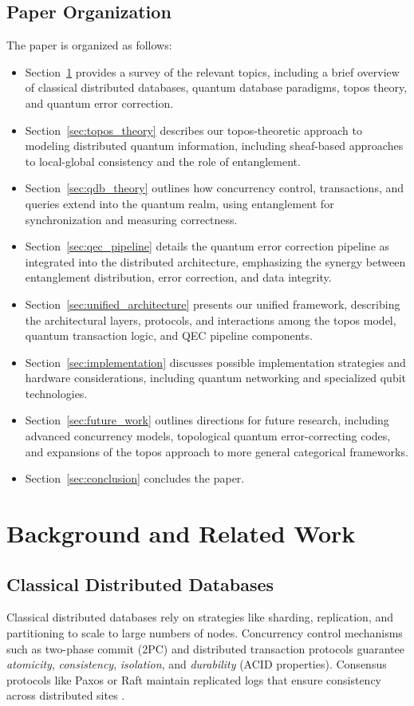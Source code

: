 \documentclass[11pt]{article}
\begin{document}
\subsection{Paper Organization}
The paper is organized as follows:
\begin{itemize}
    \item Section~\ref{sec:background} provides a survey of the relevant topics, including a brief overview of classical distributed databases, quantum database paradigms, topos theory, and quantum error correction.
    \item Section~\ref{sec:topos_theory} describes our topos-theoretic approach to modeling distributed quantum information, including sheaf-based approaches to local-global consistency and the role of entanglement.
    \item Section~\ref{sec:qdb_theory} outlines how concurrency control, transactions, and queries extend into the quantum realm, using entanglement for synchronization and measuring correctness.
    \item Section~\ref{sec:qec_pipeline} details the quantum error correction pipeline as integrated into the distributed architecture, emphasizing the synergy between entanglement distribution, error correction, and data integrity.
    \item Section~\ref{sec:unified_architecture} presents our unified framework, describing the architectural layers, protocols, and interactions among the topos model, quantum transaction logic, and QEC pipeline components.
    \item Section~\ref{sec:implementation} discusses possible implementation strategies and hardware considerations, including quantum networking and specialized qubit technologies.
    \item Section~\ref{sec:future_work} outlines directions for future research, including advanced concurrency models, topological quantum error-correcting codes, and expansions of the topos approach to more general categorical frameworks.
    \item Section~\ref{sec:conclusion} concludes the paper.
\end{itemize}

\section{Background and Related Work}
\label{sec:background}

\subsection{Classical Distributed Databases}
Classical distributed databases rely on strategies like sharding, replication, and partitioning to scale to large numbers of nodes. Concurrency control mechanisms such as two-phase commit (2PC) and distributed transaction protocols guarantee \emph{atomicity}, \emph{consistency}, \emph{isolation}, and \emph{durability} (ACID properties). Consensus protocols like Paxos or Raft maintain replicated logs that ensure consistency across distributed sites \cite{gray_transaction, lamport_paxos}.
\end{document}
